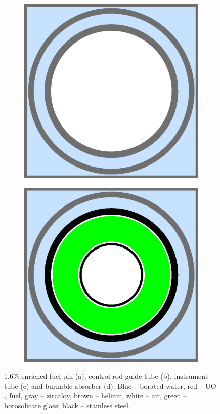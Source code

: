 \begin{figure}[H]
\begin{subfigure}{.5\textwidth}
  \caption{}
  \label{fig:chap7-pin-3.1}
\end{subfigure}
\begin{subfigure}{.5\textwidth}
  \centering
  \includegraphics[width=0.9\linewidth]{figures/benchmarks/instr-tube}
  \caption{}
  \label{fig:chap7-guide-tube}
\end{subfigure}%
\begin{subfigure}{.5\textwidth}
  \centering
  \includegraphics[width=0.9\linewidth]{figures/benchmarks/burn-abs}
  \caption{}
  \label{fig:chap7-instr-tube}
\end{subfigure}%
\caption[BEAVRS pin cell geometries]{1.6\% enriched fuel pin (a), control rod guide tube (b), instrument tube (c) and burnable absorber (d). Blue -- borated water, red -- UO$_2$ fuel, gray -- zircaloy, brown -- helium, white -- air, green -- borosolicate glass; black -- stainless steel.}
\label{fig:chap7-pin-cells}
\end{figure}

